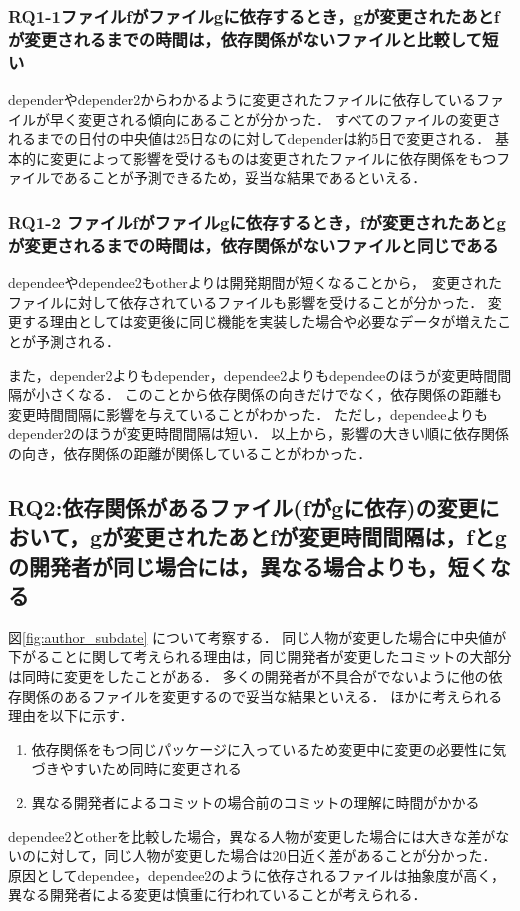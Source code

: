 \documentclass{fose2016}           %
\begin{document}
\subsubsection*{RQ1-1ファイルfがファイルgに依存するとき，gが変更されたあとfが変更されるまでの時間は，依存関係がないファイルと比較して短い}
dependerやdepender2からわかるように変更されたファイルに依存しているファイルが早く変更される傾向にあることが分かった．
すべてのファイルの変更されるまでの日付の中央値は25日なのに対してdependerは約5日で変更される．
基本的に変更によって影響を受けるものは変更されたファイルに依存関係をもつファイルであることが予測できるため，妥当な結果であるといえる．

\subsubsection*{RQ1-2 ファイルfがファイルgに依存するとき，fが変更されたあとgが変更されるまでの時間は，依存関係がないファイルと同じである}
dependeeやdependee2もotherよりは開発期間が短くなることから，　変更されたファイルに対して依存されているファイルも影響を受けることが分かった．
変更する理由としては変更後に同じ機能を実装した場合や必要なデータが増えたことが予測される．

また，depender2よりもdepender，dependee2よりもdependeeのほうが変更時間間隔が小さくなる．
このことから依存関係の向きだけでなく，依存関係の距離も変更時間間隔に影響を与えていることがわかった．
ただし，dependeeよりもdepender2のほうが変更時間間隔は短い．
以上から，影響の大きい順に依存関係の向き，依存関係の距離が関係していることがわかった．


\subsection{RQ2:依存関係があるファイル(fがgに依存)の変更において，gが変更されたあとfが変更時間間隔は，fとgの開発者が同じ場合には，異なる場合よりも，短くなる}
図\ref{fig:author_subdate}  について考察する．
同じ人物が変更した場合に中央値が下がることに関して考えられる理由は，同じ開発者が変更したコミットの大部分は同時に変更をしたことがある．
多くの開発者が不具合がでないように他の依存関係のあるファイルを変更するので妥当な結果といえる．
ほかに考えられる理由を以下に示す．
\begin{enumerate}
\item 依存関係をもつ同じパッケージに入っているため変更中に変更の必要性に気づきやすいため同時に変更される
\item 異なる開発者によるコミットの場合前のコミットの理解に時間がかかる
\end{enumerate}
dependee2とotherを比較した場合，異なる人物が変更した場合には大きな差がないのに対して，同じ人物が変更した場合は20日近く差があることが分かった．
原因としてdependee，dependee2のように依存されるファイルは抽象度が高く，異なる開発者による変更は慎重に行われていることが考えられる．
\end{document}
